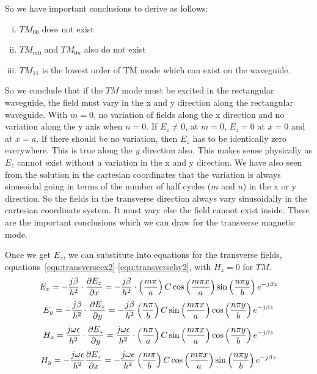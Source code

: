So we have important conclusions to derive as follows:
\begin{enumerate}[(i)]
\item $TM_{00}$ does not exist
\item $TM_{m0}$ and $TM_{0n}$ also do not exist
\item $TM_{11}$ is the lowest order of TM mode which can exist on the waveguide.
\end{enumerate}
So we conclude that if the $TM$ mode must be excited in the rectangular waveguide, the field must vary in the x and y direction along the rectangular waveguide. With $m=0$, no variation of fields along the x direction and no variation along the y axis when $n=0$. If $E_z \neq 0$, at $m=0$, $E_z=0$ at $x=0$ and at $x=a$. If there should be no variation, then $E_z$ has to be identically zero everywhere. This is true along the $y$ direction also. This makes sense physically as $E_z$ cannot exist without a variation in the x and y direction. We have also seen from the solution in the cartesian coordinates that the variation is always sinusoidal going in terms of the number of half cycles ($m$ and $n$) in the x or y direction. So the fields in the transverse direction always vary sinusoidally in the cartesian coordinate system. It must vary else the field cannot exist inside. These are the important conclusions which we can draw for the transverse magnetic mode.

Once we get $E_z$, we can substitute into equations for the transverse fields, equations~\ref{eqn:transverseex2}-\ref{eqn:transversehy2}, with $H_{z} = 0$ for $TM$.
\begin{dmath*}
E_x = -\frac{j \beta}{h^2}\cdot\pdv{E_{z}}{x} = -\frac{j \beta}{h^{2}}\cdot\left(\frac{m\pi}{a}\right) C\cos \left(\frac{m\pi x}{a}\right)\sin \left(\frac{n\pi y}{b}\right)e^{-j \beta z}
\end{dmath*}
\begin{dmath*}
E_y = -\frac{j \beta}{h^2}\cdot \pdv{E_z}{y} = -\frac{j \beta}{h^{2}}\left(\frac{n\pi}{b}\right) C \sin\left(\frac{m\pi x}{a}\right)\cos \left(\frac{n\pi y}{b}\right)e^{-j \beta z}
\end{dmath*}
\begin{dmath*}
H_x = \frac{j \omega\epsilon}{h^2}\cdot\pdv{E_z}{y} = \frac{j \omega\epsilon}{h^{2}}\cdot\left(\frac{n\pi}{a}\right) C \sin \left(\frac{m\pi x}{a}\right)\cos \left(\frac{n\pi y}{b}\right)e^{-j \beta z}
\end{dmath*}
\begin{dmath*}
H_y =-\frac{j \omega\epsilon}{h^2}\pdv{E_z}{x} = -\frac{j \omega\epsilon}{h^{2}}\left(\frac{m\pi}{b}\right) C \cos \left(\frac{m\pi x}{a}\right)\sin \left(\frac{n\pi y}{b}\right)e^{-j \beta z}
\end{dmath*}

